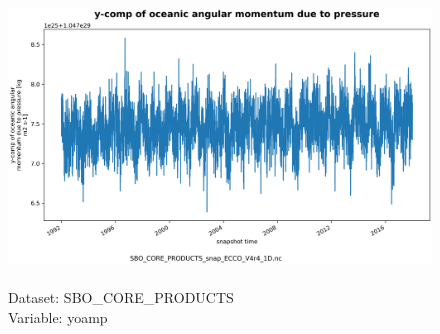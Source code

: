 \begin{figure}[H]
\centering
\includegraphics[scale=0.5]{../images/plots/oneD_plots/SBO_Core_Products/yoamp.png}
\caption{\\Dataset: SBO\_CORE\_PRODUCTS\\Variable: yoamp}
\label{tab:table-SBO_CORE_PRODUCTS_yoamp-Plot}
\end{figure}
\pagebreak
